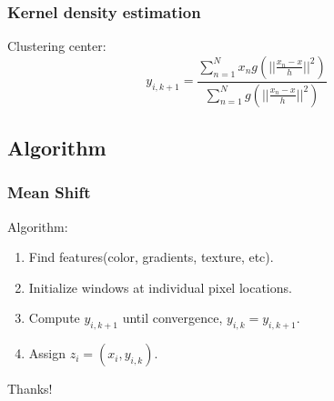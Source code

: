 \documentclass[notheorems,serif,table,compress]{beamer}  %
\begin{document}
\begin{frame}
\frametitle{Kernel density estimation}

Clustering center:
          \begin{displaymath}
              y_{i,k+1}=\frac{\sum_{n=1}^{N}x_{n}g(||\frac{x_{n}-x}{h}||^{2})}{\sum_{n=1}^{N}g(||\frac{x_{n}-x}{h}||^{2})}
           \end{displaymath}
\end{frame}

\subsection{Algorithm}
\begin{frame}
\frametitle{Mean Shift}
    {\color{blue}Algorithm:}
    \begin{enumerate}
      \item Find features(color, gradients, texture, etc).
      \item Initialize windows at individual pixel locations.
      \item Compute $y_{i,k+1}$ until convergence, $y_{i,k}=y_{i,k+1}$.
      \item Assign $z_{i}=(x_{i},y_{i,k})$.
    \end{enumerate}
\end{frame}

\begin{frame}
  \vspace{2cm}
  \centering
  \color{blue}\Huge{Thanks!}
  \vspace{1.5cm}
 

\end{frame}
\end{document}
